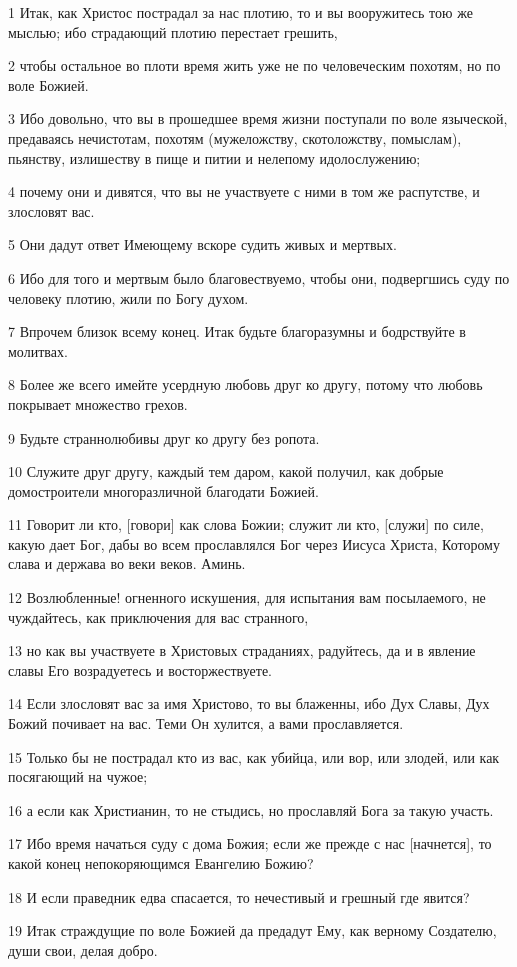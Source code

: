 \par 1 Итак, как Христос пострадал за нас плотию, то и вы вооружитесь тою же мыслью; ибо страдающий плотию перестает грешить,
\par 2 чтобы остальное во плоти время жить уже не по человеческим похотям, но по воле Божией.
\par 3 Ибо довольно, что вы в прошедшее время жизни поступали по воле языческой, предаваясь нечистотам, похотям (мужеложству, скотоложству, помыслам), пьянству, излишеству в пище и питии и нелепому идолослужению;
\par 4 почему они и дивятся, что вы не участвуете с ними в том же распутстве, и злословят вас.
\par 5 Они дадут ответ Имеющему вскоре судить живых и мертвых.
\par 6 Ибо для того и мертвым было благовествуемо, чтобы они, подвергшись суду по человеку плотию, жили по Богу духом.
\par 7 Впрочем близок всему конец. Итак будьте благоразумны и бодрствуйте в молитвах.
\par 8 Более же всего имейте усердную любовь друг ко другу, потому что любовь покрывает множество грехов.
\par 9 Будьте страннолюбивы друг ко другу без ропота.
\par 10 Служите друг другу, каждый тем даром, какой получил, как добрые домостроители многоразличной благодати Божией.
\par 11 Говорит ли кто, [говори] как слова Божии; служит ли кто, [служи] по силе, какую дает Бог, дабы во всем прославлялся Бог через Иисуса Христа, Которому слава и держава во веки веков. Аминь.
\par 12 Возлюбленные! огненного искушения, для испытания вам посылаемого, не чуждайтесь, как приключения для вас странного,
\par 13 но как вы участвуете в Христовых страданиях, радуйтесь, да и в явление славы Его возрадуетесь и восторжествуете.
\par 14 Если злословят вас за имя Христово, то вы блаженны, ибо Дух Славы, Дух Божий почивает на вас. Теми Он хулится, а вами прославляется.
\par 15 Только бы не пострадал кто из вас, как убийца, или вор, или злодей, или как посягающий на чужое;
\par 16 а если как Христианин, то не стыдись, но прославляй Бога за такую участь.
\par 17 Ибо время начаться суду с дома Божия; если же прежде с нас [начнется], то какой конец непокоряющимся Евангелию Божию?
\par 18 И если праведник едва спасается, то нечестивый и грешный где явится?
\par 19 Итак страждущие по воле Божией да предадут Ему, как верному Создателю, души свои, делая добро.

